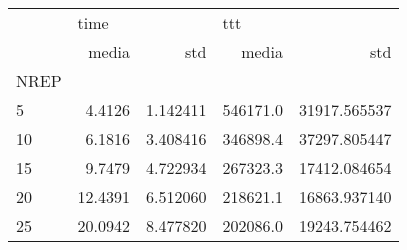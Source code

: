 \begin{tabular}{lrrrr}
\toprule
{} & \multicolumn{2}{l}{time} & \multicolumn{2}{l}{ttt} \\
{} &    media &       std &     media &           std \\
NREP &          &           &           &               \\
\midrule
5    &   4.4126 &  1.142411 &  546171.0 &  31917.565537 \\
10   &   6.1816 &  3.408416 &  346898.4 &  37297.805447 \\
15   &   9.7479 &  4.722934 &  267323.3 &  17412.084654 \\
20   &  12.4391 &  6.512060 &  218621.1 &  16863.937140 \\
25   &  20.0942 &  8.477820 &  202086.0 &  19243.754462 \\
\bottomrule
\end{tabular}
